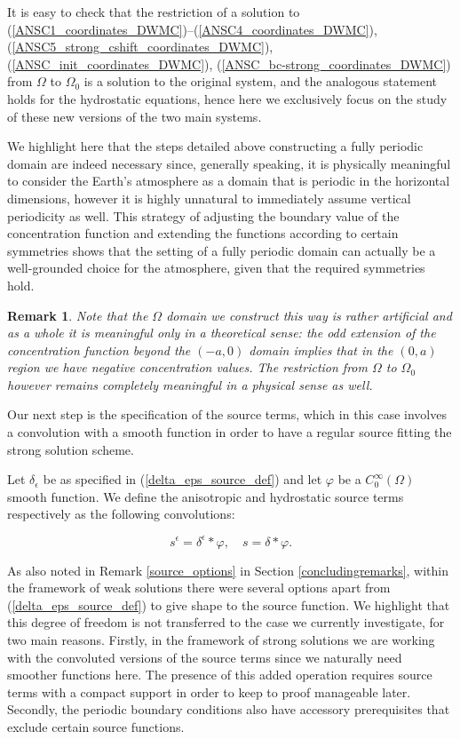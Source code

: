 \documentclass[12pt]{report}
\numberwithin{theorem}{chapter}
\numberwithin{corollary}{chapter}
\numberwithin{lemma}{chapter}
\newtheorem{remark}{Remark}
\numberwithin{remark}{chapter}
\numberwithin{definition}{chapter}
\numberwithin{prop}{chapter}
\begin{document}
It is easy to check that the restriction of a solution to (\ref{ANSC1_coordinates_DWMC})--(\ref{ANSC4_coordinates_DWMC}), (\ref{ANSC5_strong_cshift_coordinates_DWMC}), (\ref{ANSC_init_coordinates_DWMC}), (\ref{ANSC_bc-strong_coordinates_DWMC}) from $\Omega$ to $\Omega_0$ is a solution to the original system, and the analogous statement holds for the hydrostatic equations, hence here we exclusively focus on the study of these new versions of the two main systems.

We highlight here that the steps detailed above constructing a fully periodic domain are indeed necessary since, generally speaking, it is physically meaningful to consider the Earth's atmosphere as a domain that is periodic in the horizontal dimensions, however it is highly unnatural to immediately assume vertical periodicity as well. This strategy of adjusting the boundary value of the concentration function and extending the functions according to certain symmetries shows that the setting of a fully periodic domain can actually be a well-grounded choice for the atmosphere, given that the required symmetries hold.

\begin{remark}
\normalfont Note that the $\Omega$ domain we construct this way is rather artificial and as a whole it is meaningful only in a theoretical sense: the odd extension of the concentration function beyond the $(-a, 0)$ domain implies that in the $(0,a)$ region we have negative concentration values. The restriction from $\Omega$ to $\Omega_0$ however remains completely meaningful in a physical sense as well.
\end{remark}

Our next step is the specification of the source terms, which in this case involves a convolution with a smooth function in order to have a regular source fitting the strong solution scheme.

Let $\delta_\epsilon$ be as specified in (\ref{delta_eps_source_def}) and let $\varphi$ be a $C^\infty_0 (\Omega)$ smooth function. We define the anisotropic and hydrostatic source terms respectively as the following convolutions:

\begin{equation} \label{sourcetermdefinitionstrong} s^\epsilon = \delta^\epsilon \ast \varphi, \quad s = \delta \ast \varphi.\end{equation}

As also noted in Remark \ref{source_options} in Section \ref{concludingremarks}, within the framework of weak solutions there were several options apart from (\ref{delta_eps_source_def}) to give shape to the source function. We highlight that this degree of freedom is not transferred to the case we currently investigate, for two main reasons. Firstly, in the framework of strong solutions we are working with the convoluted versions of the source terms since we naturally need smoother functions here. The presence of this added operation requires source terms with a compact support in order to keep to proof manageable later. Secondly, the periodic boundary conditions also have accessory prerequisites that exclude certain source functions.
\end{document}
